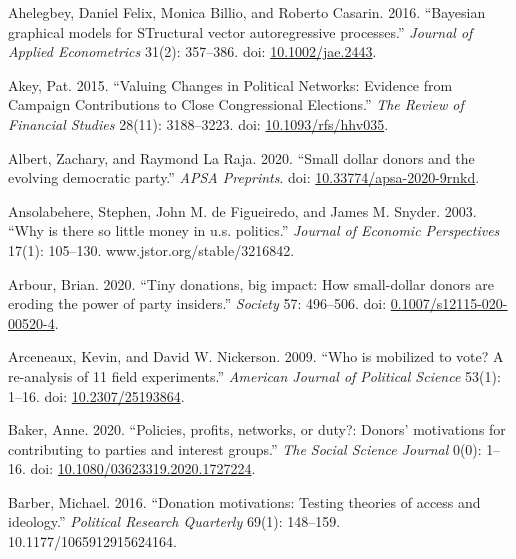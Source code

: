 \documentclass[12pt,]{article}
\newlength{\cslhangindent}
\newenvironment{CSLReferences}[2]%
    {\setlength{\parindent}{0pt}%
    \everypar{\setlength{\hangindent}{\cslhangindent}}\ignorespaces}%
    {\par}
\begin{document}
\hypertarget{refs}{}
\begin{CSLReferences}{1}{0}
\leavevmode{}%
Ahelegbey, Daniel Felix, Monica Billio, and Roberto Casarin. 2016.
{``Bayesian graphical models for STructural vector autoregressive
processes.''} \emph{Journal of Applied Econometrics} 31(2): 357--386.
doi: \href{https://doi.org/10.1002/jae.2443}{10.1002/jae.2443}.

\leavevmode{}%
Akey, Pat. 2015. {``{Valuing Changes in Political Networks: Evidence
from Campaign Contributions to Close Congressional Elections}.''}
\emph{The Review of Financial Studies} 28(11): 3188--3223. doi:
\href{https://doi.org/10.1093/rfs/hhv035}{10.1093/rfs/hhv035}.

\leavevmode{}%
Albert, Zachary, and Raymond La Raja. 2020. {``Small dollar donors and
the evolving democratic party.''} \emph{APSA Preprints}. doi:
\href{https://doi.org/10.33774/apsa-2020-9rnkd}{10.33774/apsa-2020-9rnkd}.

\leavevmode{}%
Ansolabehere, Stephen, John M. de Figueiredo, and James M. Snyder. 2003.
{``Why is there so little money in u.s. politics.''} \emph{Journal of
Economic Perspectives} 17(1): 105--130. www.jstor.org/stable/3216842.

\leavevmode{}%
Arbour, Brian. 2020. {``Tiny donations, big impact: How small-dollar
donors are eroding the power of party insiders.''} \emph{Society} 57:
496--506. doi:
\href{https://doi.org/0.1007/s12115-020-00520-4}{0.1007/s12115-020-00520-4}.

\leavevmode{}%
Arceneaux, Kevin, and David W. Nickerson. 2009. {``Who is mobilized to
vote? A re-analysis of 11 field experiments.''} \emph{American Journal
of Political Science} 53(1): 1--16. doi:
\href{https://doi.org/10.2307/25193864}{10.2307/25193864}.

\leavevmode{}%
Baker, Anne. 2020. {``Policies, profits, networks, or duty?: Donors'
motivations for contributing to parties and interest groups.''}
\emph{The Social Science Journal} 0(0): 1--16. doi:
\href{https://doi.org/10.1080/03623319.2020.1727224}{10.1080/03623319.2020.1727224}.

\leavevmode{}%
Barber, Michael. 2016. {``Donation motivations: Testing theories of
access and ideology.''} \emph{Political Research Quarterly} 69(1):
148--159. 10.1177/1065912915624164.


\end{CSLReferences}
\end{document}
